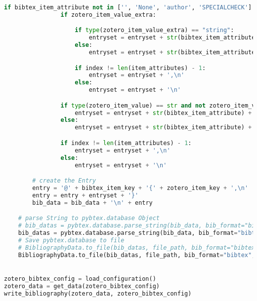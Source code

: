 \begin{lstlisting}[language=python, caption=Python LaTex - zotero - Zotero BibLaTex Importer,captionpos=b,label={lst:zotero},breaklines=true]
            if bibtex_item_attribute not in ['', 'None', 'author', 'SPECIALCHECK'] and zotero_item_value not in ['', None, []]:
                if zotero_item_value_extra:

                    if type(zotero_item_value_extra) == "string":
                        entryset = entryset + str(bibtex_item_attribute_extra) + '=\"' + str(zotero_item_value_extra) + '\"'
                    else:
                        entryset = entryset + str(bibtex_item_attribute_extra) + '=' + str(zotero_item_value_extra)

                    if index != len(item_attributes) - 1:
                        entryset = entryset + ',\n'
                    else:
                        entryset = entryset + '\n'

                if type(zotero_item_value) == str and not zotero_item_value.isnumeric():
                    entryset = entryset + str(bibtex_item_attribute) + '=\"' + str(zotero_item_value) + '\"'
                else:
                    entryset = entryset + str(bibtex_item_attribute) + '=' + str(zotero_item_value)

                if index != len(item_attributes) - 1:
                    entryset = entryset + ',\n'
                else:
                    entryset = entryset + '\n'

        # create the Entry
        entry = '@' + bibtex_item_key + '{' + zotero_item_key + ',\n'
        entry = entry + entryset + '}'
        bib_data = bib_data + '\n' + entry

    # parse String to pybtex.database Object
    # bib_datas = pybtex.database.parse_string(bib_data, bib_format="bibtex", encoding='ISO-8859-1')
    bib_datas = pybtex.database.parse_string(bib_data, bib_format="bibtex", encoding='Iutf-8')
    # Save pybtex.database to file
    # BibliographyData.to_file(bib_datas, file_path, bib_format="bibtex", encoding='ISO-8859-1')
    BibliographyData.to_file(bib_datas, file_path, bib_format="bibtex", encoding='utf-8')


zotero_bibtex_config = load_configuration()
zotero_data = get_data(zotero_bibtex_config)
write_bibliography(zotero_data, zotero_bibtex_config)
\end{lstlisting}